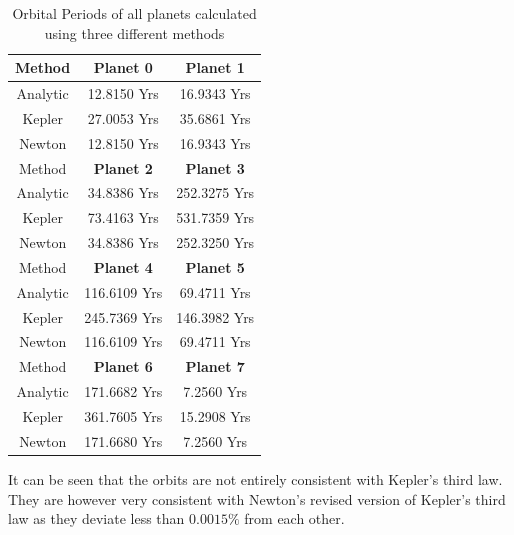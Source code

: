 \documentclass[reprint,english,notitlepage]{revtex4-2}
\begin{document}
\begin{table}[h]
    \begin{tabular}{ |c|c|c| }
        \hline
		Method & \textbf{Planet 0} & \textbf{Planet 1}\\
		\hline
        Analytic	& 12.8150 Yrs & 16.9343 Yrs\\
		Kepler		& 27.0053 Yrs & 35.6861 Yrs\\
		Newton		& 12.8150 Yrs & 16.9343 Yrs\\
		\hline\hline
		Method & \textbf{Planet 2} & \textbf{Planet 3}\\
		\hline
        Analytic	& 34.8386 Yrs & 252.3275 Yrs\\
		Kepler		& 73.4163 Yrs & 531.7359 Yrs\\
		Newton		& 34.8386 Yrs & 252.3250 Yrs\\
		\hline\hline
		Method & \textbf{Planet 4} & \textbf{Planet 5}\\
		\hline
        Analytic	& 116.6109 Yrs & 69.4711 Yrs\\
		Kepler		& 245.7369 Yrs & 146.3982 Yrs\\
		Newton		& 116.6109 Yrs & 69.4711 Yrs\\
		\hline\hline
		Method & \textbf{Planet 6} & \textbf{Planet 7}\\
		\hline
        Analytic	& 171.6682 Yrs & 7.2560 Yrs\\
		Kepler		& 361.7605 Yrs & 15.2908 Yrs\\
		Newton		& 171.6680 Yrs & 7.2560 Yrs\\
		\hline
	\end{tabular}
    \caption{Orbital Periods of all planets calculated using three different methods}
    \label{tab:Kepler3_Table}
\end{table}


It can be seen that the orbits are not entirely consistent with Kepler's third law.
They are however very consistent with Newton's revised version of Kepler's third law as they deviate less than $0.0015\%$ from each other.
\end{document}
